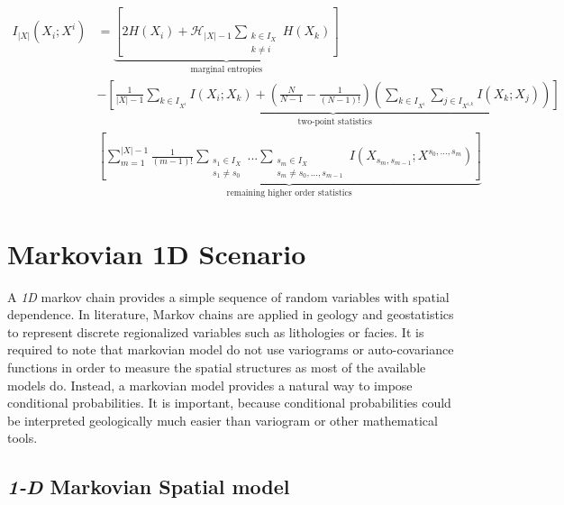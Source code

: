 \begin{align}\label{eq_mutual_info_final}
I_{|X|}(X_i;X^i) &= \underbrace{ \left[ 2H(X_i) + \mathcal{H}_{|X|-1} \sum_{\substack{k \in I_{X}\\k \neq i}} {H(X_k)} \right] }_{\text{marginal entropies}} \nonumber\\
				  &- \underbrace{  \left[	\frac{1}{|X|-1} \sum_{k \in I_{X^{i}}}{I(X_i;X_k)} + \left(\frac{N}{N-1} - \frac{1}{(N-1)!} \right) \left( \sum_{k \in I_{X^i}}{\sum_{j \in I_{X^{i,k}}}{I(X_k;X_j)}}\right)  \right]}_{\text{ two-point statistics}} \nonumber\\
				  & \underbrace{   \left[ \sum_{m=1}^{|X|-1}{\frac{1}{(m-1)!} \sum_{\substack{s_1\in I_{X}\\s_1 \neq s_0}}{... \sum_{\substack{s_m \in I_{X} \\ s_m \neq s_0,...,s_{m-1}}}{I(X_{s_m,s_{m-1}};X^{s_0,...,s_m})}}} \right] }_{\text{remaining higher order statistics}}
\end{align}




















\section{Markovian 1D Scenario}
\label{sec_Meth_Markov1D_APP}

A \emph{1D} markov chain provides a simple sequence of random variables with spatial dependence. In literature, Markov chains are applied in geology and geostatistics to represent discrete regionalized variables such as lithologies or facies. It is required to note that markovian model do not use variograms or auto-covariance functions in order to measure the spatial structures as most of the available models do. Instead, a markovian model provides a natural way to impose conditional probabilities. It is important, because conditional probabilities could be interpreted geologically much easier than variogram or other mathematical tools.

\subsection{\texorpdfstring{\emph{1-D}}{1D} Markovian Spatial model}

